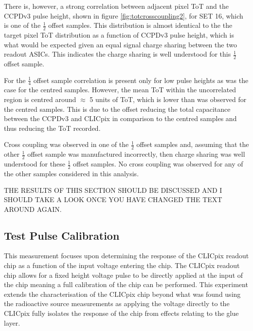 There is, however, a strong correlation between adjacent pixel ToT and the CCPDv3 pulse height, shown in figure \ref{fig:totcrosscoupling2}, for SET 16, which is one of the $\frac{1}{2}$ offset samples.  This distribution is almost identical to the the target pixel ToT distribution as a function of CCPDv3 pulse height, which is what would be expected given an equal signal charge sharing between the two readout ASICs.  This indicates the charge sharing is well understood for this $\frac{1}{2}$ offset sample.   

For the $\frac{1}{4}$ offset sample correlation is present only for low pulse heights as was the case for the centred samples.  However, the mean ToT within the uncorrelated region is centred around $\approx$ 5 units of ToT, which is lower than was observed for the centred samples.  This is due to the offset reducing the total capacitance between the CCPDv3 and CLICpix in comparison to the centred samples and thus reducing the ToT recorded.

Cross coupling was observed in one of the $\frac{1}{2}$ offset samples and, assuming that the other $\frac{1}{2}$ offset sample was manufactured incorrectly, then charge sharing was well understood for these $\frac{1}{2}$ offset samples.  No cross coupling was observed for any of the other samples considered in this analysis.  

THE RESULTS OF THIS SECTION SHOULD BE DISCUSSED AND I SHOULD TAKE A LOOK ONCE YOU HAVE CHANGED THE TEXT AROUND AGAIN.




\subsection{Test Pulse Calibration}
\label{sec:testpulsecalibration}

This measurement focuses upon determining the response of the CLICpix readout chip as a function of the input voltage entering the chip.  The CLICpix readout chip allows for a fixed height voltage pulse to be directly applied at the input of the chip meaning a full calibration of the chip can be performed.  This experiment extends the characterisation of the CLICpix chip beyond what was found using the radioactive source measurements as applying the voltage directly to the CLICpix fully isolates the response of the chip from effects relating to the glue layer.  

